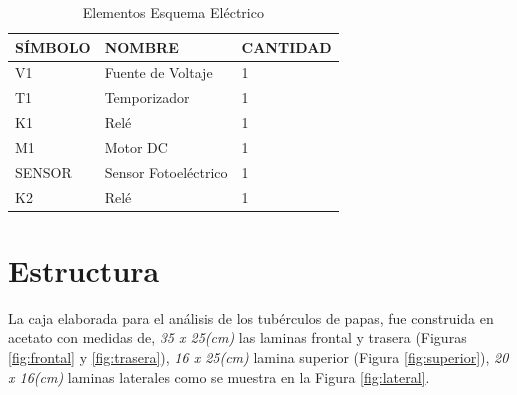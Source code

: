 \begin{table}[ht]
	\centering
	\begin{tabular}{|p{2cm}|p{5cm}|p{3cm}|}
		\hline
		SÍMBOLO & NOMBRE & CANTIDAD \\ 
		\hline
		V1 & Fuente de Voltaje & 1 \\
		\hline
		T1 & Temporizador & 1 \\
		\hline
		K1 & Relé & 1 \\
		\hline
		M1 & Motor DC & 1 \\
		\hline
		SENSOR & Sensor Fotoeléctrico & 1 \\
		\hline
		K2 & Relé & 1 \\
		\hline
	\end{tabular}	
	\caption{Elementos Esquema Eléctrico}
	\label{table:esquema}
\end{table}	

\newpage	
\section{Estructura}
La caja elaborada para el análisis de los tubérculos de papas, fue construida en acetato con medidas de, \textit{35 x 25(cm)} las laminas frontal y trasera (Figuras \ref{fig:frontal} y \ref{fig:trasera}), \textit{16 x 25(cm)} lamina superior (Figura \ref{fig:superior}), \textit{20 x 16(cm)} laminas laterales como se muestra en la Figura \ref{fig:lateral}.


